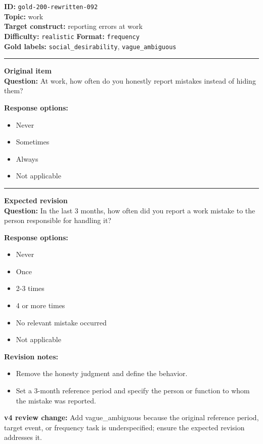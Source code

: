 \documentclass[10pt,a4paper]{article}
\newcommand{\sectionline}{\vspace{0.15em}\hrule\vspace{0.35em}}
\begin{document}
\begin{tcolorbox}[colframe=FlawRed,colback=white,colbacktitle=FlawRed!9,coltitle=black,title={Item 092\hfill Flawed item}]
\textbf{ID:} \texttt{gold-200-rewritten-092}\\
\textbf{Topic:} work\\
\textbf{Target construct:} reporting errors at work\\
\textbf{Difficulty:} \texttt{realistic} \quad \textbf{Format:} \texttt{frequency}\\
\textbf{Gold labels:} \texttt{social\_desirability}, \texttt{vague\_ambiguous}\\
\sectionline
\textbf{Original item}\\
\textbf{Question:} At work, how often do you honestly report mistakes instead of hiding them?
\par\textbf{Response options:}
\begin{itemize}
\item Never
\item Sometimes
\item Always
\item Not applicable
\end{itemize}
\sectionline
\textbf{Expected revision}\\
\textbf{Question:} In the last 3 months, how often did you report a work mistake to the person responsible for handling it?
\par\textbf{Response options:}
\begin{itemize}
\item Never
\item Once
\item 2-3 times
\item 4 or more times
\item No relevant mistake occurred
\item Not applicable
\end{itemize}
\par\textbf{Revision notes:}
\begin{itemize}
\item Remove the honesty judgment and define the behavior.
\item Set a 3-month reference period and specify the person or function to whom the mistake was reported.
\end{itemize}
\par\textbf{v4 review change:} Add vague\_ambiguous because the original reference period, target event, or frequency task is underspecified; ensure the expected revision addresses it.
\end{tcolorbox}
\end{document}
